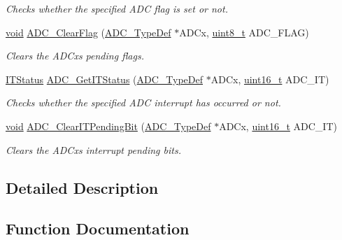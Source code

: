 \begin{DoxyCompactItemize}
\begin{DoxyCompactList}\small\item\em Checks whether the specified A\+DC flag is set or not. \end{DoxyCompactList}\item 
\hyperlink{usb__devapi_8h_afabf60e7f57651d6d595a02c75f07cd0}{void} \hyperlink{group___a_d_c___private___functions_gaf34f36798f811b4a41321ea2d12118d4}{A\+D\+C\+\_\+\+Clear\+Flag} (\hyperlink{struct_a_d_c___type_def}{A\+D\+C\+\_\+\+Type\+Def} $\ast$A\+D\+Cx, \hyperlink{_p_e___types_8h_aba7bc1797add20fe3efdf37ced1182c5}{uint8\+\_\+t} A\+D\+C\+\_\+\+F\+L\+AG)
\begin{DoxyCompactList}\small\item\em Clears the A\+D\+Cx\textquotesingle{}s pending flags. \end{DoxyCompactList}\item 
\hyperlink{agilefox_2library_2inc_2stm32f10x__type_8h_aacbd7ed539db0aacd973a0f6eca34074}{I\+T\+Status} \hyperlink{group___a_d_c___private___functions_gaa1d3b910a83dbf14d4f68c8eef058612}{A\+D\+C\+\_\+\+Get\+I\+T\+Status} (\hyperlink{struct_a_d_c___type_def}{A\+D\+C\+\_\+\+Type\+Def} $\ast$A\+D\+Cx, \hyperlink{_p_e___types_8h_a1f1825b69244eb3ad2c7165ddc99c956}{uint16\+\_\+t} A\+D\+C\+\_\+\+IT)
\begin{DoxyCompactList}\small\item\em Checks whether the specified A\+DC interrupt has occurred or not. \end{DoxyCompactList}\item 
\hyperlink{usb__devapi_8h_afabf60e7f57651d6d595a02c75f07cd0}{void} \hyperlink{group___a_d_c___private___functions_ga601c6a67bd883eb631ecc7aa5e999b9c}{A\+D\+C\+\_\+\+Clear\+I\+T\+Pending\+Bit} (\hyperlink{struct_a_d_c___type_def}{A\+D\+C\+\_\+\+Type\+Def} $\ast$A\+D\+Cx, \hyperlink{_p_e___types_8h_a1f1825b69244eb3ad2c7165ddc99c956}{uint16\+\_\+t} A\+D\+C\+\_\+\+IT)
\begin{DoxyCompactList}\small\item\em Clears the A\+D\+Cx\textquotesingle{}s interrupt pending bits. \end{DoxyCompactList}\end{DoxyCompactItemize}


\subsection{Detailed Description}


\subsection{Function Documentation}
